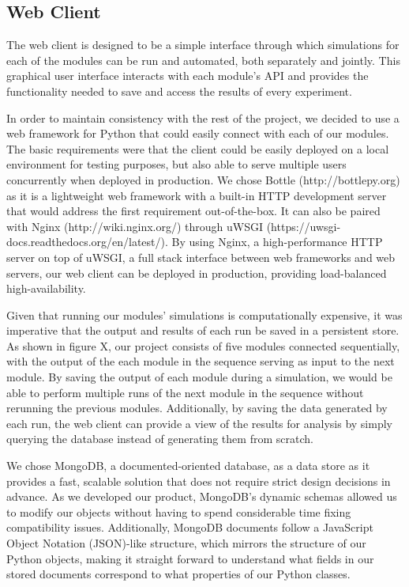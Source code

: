 \documentclass[a4paper,11pt]{article}
\begin{document}
\subsection{Web Client}

The web client is designed to be a simple interface through which simulations for each of the modules can be run and automated, both separately and jointly. This graphical user interface interacts with each module's API and provides the functionality needed to save and access the results of every experiment.

In order to maintain consistency with the rest of the project, we decided to use a web framework for Python that could easily connect with each of our modules. The basic requirements were that the client could be easily deployed on a local environment for testing purposes, but also able to serve multiple users concurrently when deployed in production. We chose Bottle (http://bottlepy.org) as it is a lightweight web framework with a built-in HTTP development server that would address the first requirement out-of-the-box. It can also be paired with Nginx (http://wiki.nginx.org/) through uWSGI (https://uwsgi-docs.readthedocs.org/en/latest/). By using Nginx, a high-performance HTTP server on top of uWSGI, a full stack interface between web frameworks and web servers, our web client can be deployed in production, providing load-balanced high-availability.

Given that running our modules' simulations is computationally expensive, it was imperative that the output and results of each run be saved in a persistent store. As shown in figure X, our project consists of five modules connected sequentially, with the output of the each module in the sequence serving as input to the next module. By saving the output of each module during a simulation, we would be able to perform multiple runs of the next module in the sequence without rerunning the previous modules. Additionally, by saving the data generated by each run, the web client can provide a view of the results for analysis by simply querying the database instead of generating them from scratch.

We chose MongoDB, a documented-oriented database, as a data store as it provides a fast, scalable solution that does not require strict design decisions in advance. As we developed our product, MongoDB's dynamic schemas allowed us to modify our objects without having to spend considerable time fixing compatibility issues. Additionally, MongoDB documents follow a JavaScript Object Notation (JSON)-like structure, which mirrors the structure of our Python objects, making it straight forward to understand what fields in our stored documents correspond to what properties of our Python classes.
\end{document}
